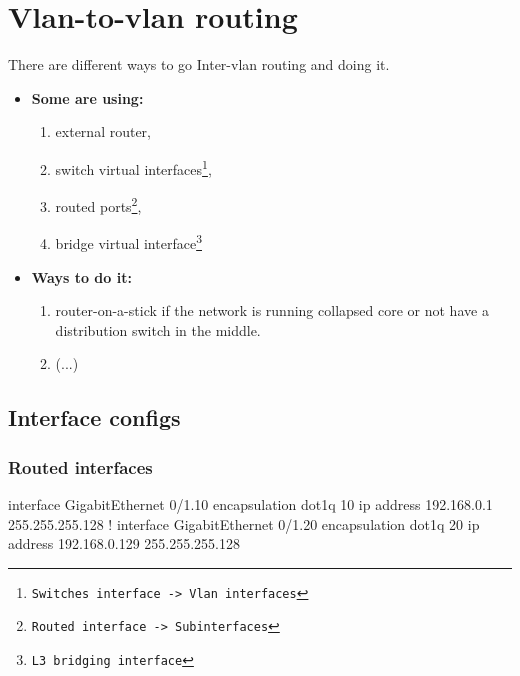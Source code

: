 \section{Vlan-to-vlan routing}


There are different ways to go  Inter-vlan routing and doing it.

\begin{itemize}
    \item \textbf{Some are using:}
    \begin{enumerate}
        \item external router,
        \item switch virtual interfaces\footnote{\texttt{Switches interface -> Vlan interfaces}},
        \item routed ports\footnote{\texttt{Routed interface -> Subinterfaces}},
        \item bridge virtual interface\footnote{\texttt{L3 bridging interface}}
    \end{enumerate}
    \item \textbf{Ways to do it:}
    \begin{enumerate}
        \item router-on-a-stick if the network is running collapsed core or not have a distribution switch in the middle.
        \item (...)
    \end{enumerate}
\end{itemize}

\pagebreak

\subsection{Interface configs}

\subsubsection{Routed interfaces}

\begin{txt}
interface GigabitEthernet 0/1.10
 encapsulation dot1q 10
 ip address 192.168.0.1 255.255.255.128
!
interface GigabitEthernet 0/1.20
 encapsulation dot1q 20
 ip address 192.168.0.129 255.255.255.128
\end{txt}

